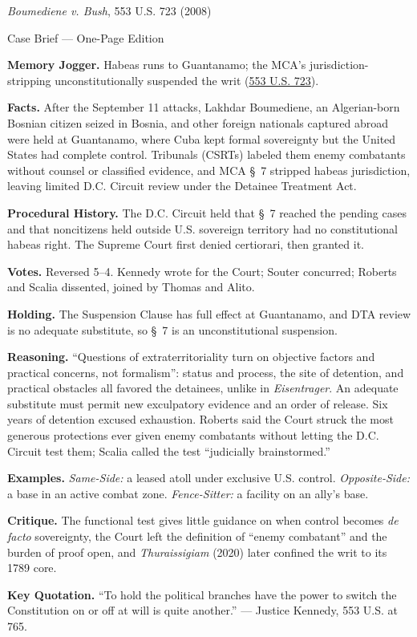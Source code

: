 \documentclass[12pt]{article}
\begin{document}
\begin{center}
{\Large \textit{Boumediene v. Bush}, 553 U.S. 723 (2008)\par}
\vspace{0.3em}
{\normalsize Case Brief --- One-Page Edition\par}
\end{center}

\textbf{Memory Jogger.} Habeas runs to Guantanamo; the MCA's jurisdiction-stripping unconstitutionally suspended the writ (\href{https://supreme.justia.com/cases/federal/us/553/723/}{553 U.S. 723}).

\textbf{Facts.} After the September 11 attacks, Lakhdar Boumediene, an Algerian-born Bosnian citizen seized in Bosnia, and other foreign nationals captured abroad were held at Guantanamo, where Cuba kept formal sovereignty but the United States had complete control. Tribunals (CSRTs) labeled them enemy combatants without counsel or classified evidence, and MCA \S~7 stripped habeas jurisdiction, leaving limited D.C. Circuit review under the Detainee Treatment Act.

\textbf{Procedural History.} The D.C. Circuit held that \S~7 reached the pending cases and that noncitizens held outside U.S. sovereign territory had no constitutional habeas right. The Supreme Court first denied certiorari, then granted it.

\textbf{Votes.} Reversed 5--4. Kennedy wrote for the Court; Souter concurred; Roberts and Scalia dissented, joined by Thomas and Alito.

\textbf{Holding.} The Suspension Clause has full effect at Guantanamo, and DTA review is no adequate substitute, so \S~7 is an unconstitutional suspension.

\textbf{Reasoning.} ``Questions of extraterritoriality turn on objective factors and practical concerns, not formalism'': status and process, the site of detention, and practical obstacles all favored the detainees, unlike in \textit{Eisentrager}. An adequate substitute must permit new exculpatory evidence and an order of release. Six years of detention excused exhaustion. Roberts said the Court struck the most generous protections ever given enemy combatants without letting the D.C. Circuit test them; Scalia called the test ``judicially brainstormed.''

\textbf{Examples.} \emph{Same-Side:} a leased atoll under exclusive U.S. control. \emph{Opposite-Side:} a base in an active combat zone. \emph{Fence-Sitter:} a facility on an ally's base.

\textbf{Critique.} The functional test gives little guidance on when control becomes \textit{de facto} sovereignty, the Court left the definition of ``enemy combatant'' and the burden of proof open, and \textit{Thuraissigiam} (2020) later confined the writ to its 1789 core.

\textbf{Key Quotation.} ``To hold the political branches have the power to switch the Constitution on or off at will is quite another.'' --- Justice Kennedy, 553 U.S. at 765.
\end{document}
